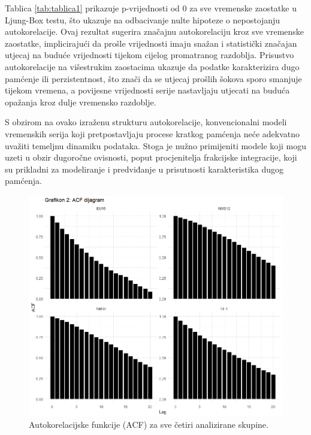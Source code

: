 \documentclass{crebsshr}
\begin{document}
Tablica \ref{tab:tablica1} prikazuje p-vrijednosti od 0 za sve vremenske zaostatke u Ljung-Box testu, što ukazuje na odbacivanje nulte hipoteze o nepostojanju autokorelacije. Ovaj rezultat sugerira značajnu autokorelaciju kroz sve vremenske zaostatke, implicirajući da prošle vrijednosti imaju snažan i statistički značajan utjecaj na buduće vrijednosti tijekom cijelog promatranog razdoblja. Prisustvo autokorelacije na višestrukim zaostacima ukazuje da podatke karakterizira dugo pamćenje ili perzistentnost, što znači da se utjecaj prošlih šokova sporo smanjuje tijekom vremena, a povijesne vrijednosti serije nastavljaju utjecati na buduća opažanja kroz dulje vremensko razdoblje.

S obzirom na ovako izraženu strukturu autokorelacije, konvencionalni modeli vremenskih serija koji pretpostavljaju procese kratkog pamćenja neće adekvatno uvažiti temeljnu dinamiku podataka. Stoga je nužno primijeniti modele koji mogu uzeti u obzir dugoročne ovisnosti, poput procjenitelja frakcijske integracije, koji su prikladni za modeliranje i predviđanje u prisutnosti karakteristika dugog pamćenja.

\begin{figure}[ht]
\centering
\includegraphics[width=\linewidth]{Rplot01.png} %
\caption{Autokorelacijske funkcije (ACF) za sve četiri analizirane skupine.}
\label{fig:grafikon2}
\end{figure}
\end{document}
